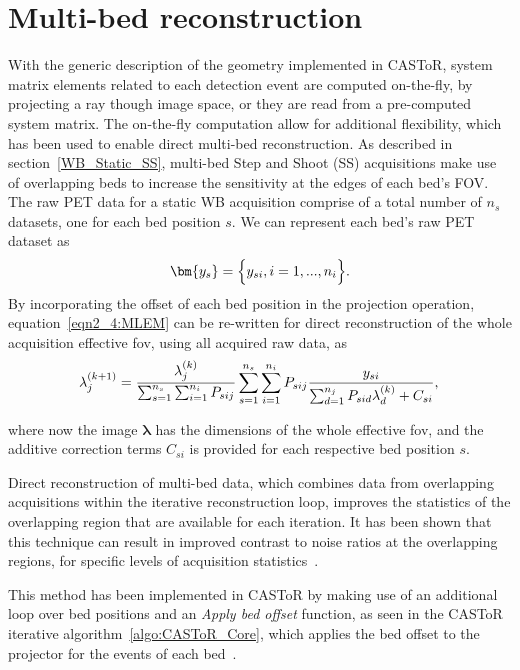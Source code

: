 \section{Multi-bed reconstruction}
\label{chap2_4:MultiBedRecon}
With the generic description of the geometry implemented in CASToR, system matrix elements related to each detection event are computed on-the-fly, by projecting a ray though image space, or they are read from a pre-computed system matrix. 
The on-the-fly computation allow for additional flexibility, which has been used to enable direct multi-bed reconstruction. 
As described in section~\ref{WB_Static_SS}, multi-bed Step and Shoot (SS) acquisitions make use of overlapping beds to increase the sensitivity at the edges of each bed's FOV. The raw PET data for a static WB acquisition comprise of a total number of $n_s$ datasets, one for each bed position $s$. We can represent each bed's raw PET dataset as
%
\begin{equation}
   \bm{y_s} = \Big\{ {y_{si},i=1,...,n_i} \Big\} \\ . \\
\end{equation}
%
%
By incorporating the offset of each bed position in the projection operation, equation~\ref{eqn2_4:MLEM} can be re-written for direct reconstruction of the whole acquisition effective \gls{fov}, using all acquired raw data, as
\begin{equation}
\lambda_j^{(k+1)} = \frac{\lambda_j^{(k)}}{\sum_{s=1}^{n_s} \sum_{i=1}^{n_i} P_{sij}} 
\sum_{s=1}^{n_s} \sum_{i=1}^{n_i} P_{sij} 
\frac{y_{si}}{\sum_{d=1}^{n_j} P_{sid}\lambda_d^{(k)} + C_{si} } \\ , \\
\label{eqn2_4:MLEM_multibed}
\end{equation} 

where now the image $\bm{\lambda}$ has the dimensions of the whole effective \gls{fov}, and the additive correction terms $C_{si}$ is provided for each respective bed position $s$. 

Direct reconstruction of multi-bed data, which combines data from overlapping acquisitions within the iterative reconstruction loop, improves the statistics of the overlapping region that are available for each iteration. It has been shown that this technique can result in improved contrast to noise ratios at the overlapping regions, for specific levels of acquisition statistics~\cite{Ross2004}. 

This method has been implemented in CASToR by making use of an additional loop over bed positions and an \textit{Apply bed offset} function, as seen in the CASToR iterative algorithm~\ref{algo:CASToR_Core}, which applies the bed offset to the projector for the events of each bed~\cite{Stute2014}.

